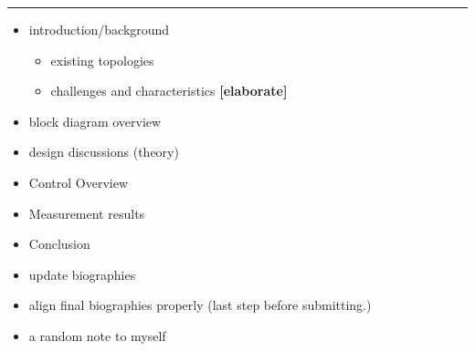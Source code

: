 
\vfill
\pagebreak

\hrule

\begin{mdframed}[style=outlinestyle,frametitle={Inital Outline:}]
\begin{itemize}
	\item introduction/background
	\begin{itemize}
		\item existing topologies
		\item challenges and characteristics \textbf{[elaborate]}
	\end{itemize}
	\item block diagram overview
	\item design discussions (theory)
	\item Control Overview
	\item Measurement results
	\item Conclusion
\end{itemize}
\end{mdframed}

\begin{mdframed}[style=notesstyle,frametitle={Remaining TODO items:}]
\begin{itemize}
		\item update biographies
	\item align final biographies properly (last step before submitting.)
	\item a random note to myself
\end{itemize}
\end{mdframed}

\listoftodos

